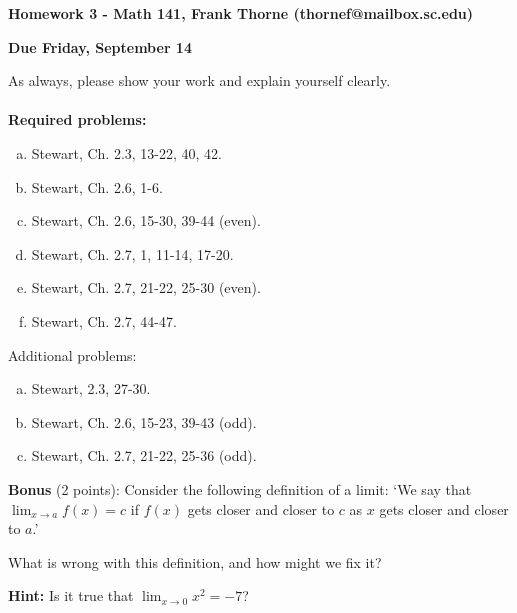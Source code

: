 \documentclass[12pt]{article}
\begin{document}
\setlength{\topmargin}{-2mm}





\begin{center}{\bf Homework 3 - Math 141, Frank Thorne (thornef@mailbox.sc.edu)}
\end{center}
\begin{center}
{\bf Due Friday, September 14}
\end{center}

As always, please show your work and explain yourself clearly. 
\\
\\
{\bf Required problems:}
\begin{enumerate}[(a)]

\item
Stewart, Ch. 2.3, 13-22, 40, 42.

\item
Stewart, Ch. 2.6, 1-6.

\item
Stewart, Ch. 2.6, 15-30, 39-44 (even).
\item
Stewart, Ch. 2.7, 1, 11-14, 17-20.

\item
Stewart, Ch. 2.7, 21-22, 25-30 (even).

\item
Stewart, Ch. 2.7, 44-47.


\end{enumerate}
Additional problems:

\begin{enumerate}[(a)]
\item
Stewart, 2.3, 27-30.
\item
Stewart, Ch. 2.6, 15-23, 39-43 (odd).
\item
Stewart, Ch. 2.7, 21-22, 25-36 (odd).
\end{enumerate}
{\bf Bonus} (2 points):
Consider the following definition of a limit: `We say that
$\lim_{x \rightarrow a} f(x) = c$ if $f(x)$ gets closer and closer to
$c$ as $x$ gets closer and closer to $a$.'

What is wrong with this definition, and how might we fix it?

{\bf Hint:} Is it true that $\lim_{x \rightarrow 0} x^2 = -7$?
\end{document}
